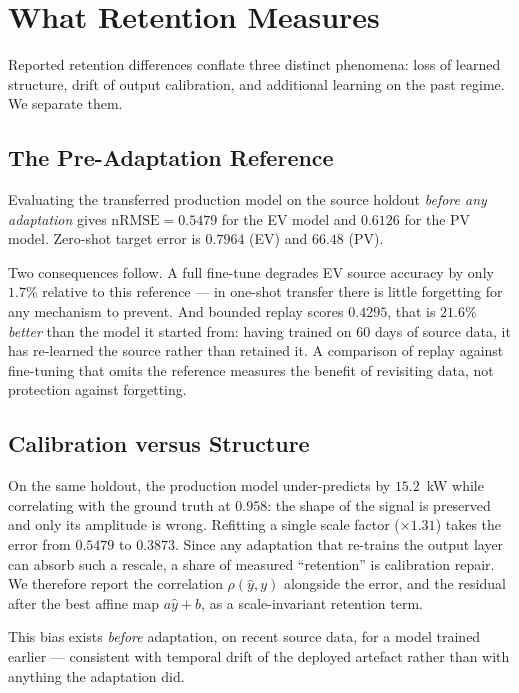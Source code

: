 \documentclass[journal]{IEEEtran}
\newcommand{\nrmse}{\mathrm{nRMSE}}
\begin{document}
\section{What Retention Measures}
\label{sec:protocol}

Reported retention differences conflate three distinct phenomena: loss of
learned structure, drift of output calibration, and additional learning on the
past regime. We separate them.

\subsection{The Pre-Adaptation Reference}
Evaluating the transferred production model on the source holdout \emph{before
any adaptation} gives $\nrmse = 0.5479$ for the EV model and $0.6126$ for the
PV model. Zero-shot target error is $0.7964$ (EV) and $66.48$ (PV).

Two consequences follow. A full fine-tune degrades EV source accuracy by only
$1.7\%$ relative to this reference --- in one-shot transfer there is little
forgetting for any mechanism to prevent. And bounded replay scores $0.4295$,
that is $21.6\%$ \emph{better} than the model it started from: having trained on
$60$ days of source data, it has re-learned the source rather than retained it.
A comparison of replay against fine-tuning that omits the reference measures the
benefit of revisiting data, not protection against forgetting.

\subsection{Calibration versus Structure}
On the same holdout, the production model under-predicts by $15.2$~kW while
correlating with the ground truth at $0.958$: the shape of the signal is
preserved and only its amplitude is wrong. Refitting a single scale factor
($\times 1.31$) takes the error from $0.5479$ to $0.3873$. Since any adaptation
that re-trains the output layer can absorb such a rescale, a share of measured
``retention'' is calibration repair. We therefore report the correlation
$\rho(\hat{y},y)$ alongside the error, and the residual after the best affine
map $a\hat{y}+b$, as a scale-invariant retention term.

This bias exists \emph{before} adaptation, on recent source data, for a model
trained earlier --- consistent with temporal drift of the deployed artefact
rather than with anything the adaptation did.
\end{document}

